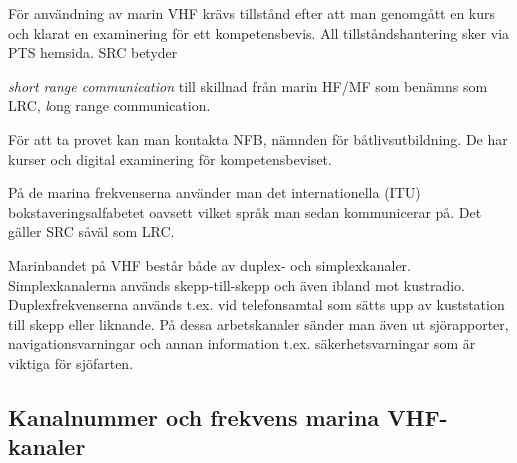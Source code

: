 För användning av marin VHF krävs tillstånd efter att man genomgått en kurs
och klarat en examinering för ett kompetensbevis. All tillståndshantering sker
via PTS hemsida. SRC betyder {\textit{short range communication }till skillnad från marin HF/MF som benämns som LRC, {\textit long range communication}.

För att ta provet kan man kontakta NFB, nämnden för båtlivsutbildning. De har
kurser och digital examinering för kompetensbeviset.

På de marina frekvenserna använder man det internationella (ITU)
bokstaveringsalfabetet oavsett vilket språk man sedan kommunicerar på. Det
gäller SRC såväl som LRC.

Marinbandet på VHF består både av duplex- och simplexkanaler. Simplexkanalerna
används skepp-till-skepp och även ibland mot kustradio. Duplexfrekvenserna
används t.ex. vid telefonsamtal som sätts upp av kuststation till skepp eller
liknande. På dessa arbetskanaler sänder man även ut sjörapporter,
navigationsvarningar och annan information t.ex. säkerhetsvarningar som är
viktiga för sjöfarten.

\clearpage
\subsection{Kanalnummer och frekvens marina VHF-kanaler}

}
